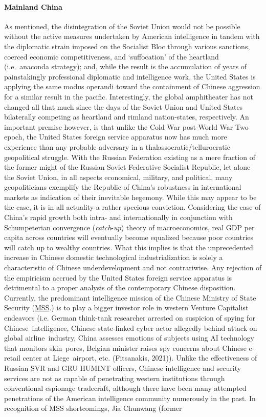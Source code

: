 \documentclass[12pt]{article}
\begin{document}
\paragraph{Mainland China} As mentioned, the disintegration of the Soviet Union would not be possible without the active measures undertaken by American intelligence in tandem with the diplomatic strain imposed on the Socialist Bloc through various sanctions, coerced economic competitiveness, and `suffocation' of the heartland (i.e.\ anaconda strategy); and, while the result is the accumulation of years of painstakingly professional diplomatic and intelligence work, the United States is applying the same modus operandi toward the containment of Chinese aggression for a similar result in the pacific. Interestingly, the global amphitheater has not changed all that much since the days of the Soviet Union and United States bilaterally competing as heartland and rimland nation-states, respectively. An important premise however, is that unlike the Cold War post-World War Two epoch, the United States foreign service apparatus now has much more experience than any probable adversary in a thalassocratic/tellurocratic geopolitical struggle. With the Russian Federation existing as a mere fraction of the former might of the Russian Soviet Federative Socialist Republic, let alone the Soviet Union, in all aspects economical, military, and political, many geopoliticians exemplify the Republic of China's robustness in international markets as indication of their inevitable hegemony. While this may appear to be the case, it is in all actuality a rather specious conviction. Considering the case of China's rapid growth both intra- and internationally in conjunction with Schumpeterian convergence (\emph{catch}-\emph{up}) theory of macroeconomics, real GDP per capita across countries will eventually become equalized because poor countries will catch up to wealthy countries. What this implies is that the unprecedented increase in Chinese domestic technological industrialization is solely a characteristic of Chinese underdevelopment and not contrariwise. Any rejection of the empiricism accrued by the United States foreign service apparatus is detrimental to a proper analysis of the contemporary Chinese disposition. Currently, the predominant intelligence mission of the Chinese Ministry of State Security (\href{https://en.wikipedia.org/wiki/Ministry_of_State_Security_(China)}{MSS}.) is to play a bigger investor role in western Venture Capitalist endeavors (i.e. German think-tank researcher arrested on suspicion of spying for Chinese intelligence, Chinese state-linked cyber actor allegedly behind attack on global airline industry, China assesses emotions of subjects using AI technology that monitors skin pores, Belgian minister raises spy concerns about Chinese e-retail center at Liege airport, etc. (Fitsanakis, 2021)). Unlike the effectiveness of Russian SVR and GRU HUMINT officers, Chinese intelligence and security services are not as capable of penetrating western institutions through conventional espionage tradecraft, although there have been many attempted penetrations of the American intelligence community numerously in the past. In recognition of MSS shortcomings, Jia Chunwang (former 
\end{document}
